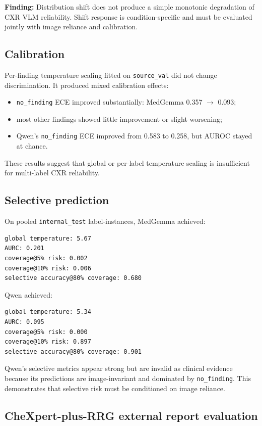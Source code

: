 \textbf{Finding:} Distribution shift does not produce a simple monotonic degradation of CXR VLM reliability. Shift response is condition-specific and must be evaluated jointly with image reliance and calibration.

\subsection{Calibration}

Per-finding temperature scaling fitted on \texttt{source\_val} did not change discrimination. It produced mixed calibration effects:

\begin{itemize}
\item \texttt{no\_finding} ECE improved substantially: MedGemma 0.357 $\rightarrow$ 0.093;
\item most other findings showed little improvement or slight worsening;
\item Qwen’s \texttt{no\_finding} ECE improved from 0.583 to 0.258, but AUROC stayed at chance.
\end{itemize}

These results suggest that global or per-label temperature scaling is insufficient for multi-label CXR reliability.

\subsection{Selective prediction}

On pooled \texttt{internal\_test} label-instances, MedGemma achieved:

\begin{verbatim}
global temperature: 5.67
AURC: 0.201
coverage@5% risk: 0.002
coverage@10% risk: 0.006
selective accuracy@80% coverage: 0.680
\end{verbatim}

Qwen achieved:

\begin{verbatim}
global temperature: 5.34
AURC: 0.095
coverage@5% risk: 0.000
coverage@10% risk: 0.897
selective accuracy@80% coverage: 0.901
\end{verbatim}

Qwen’s selective metrics appear strong but are invalid as clinical evidence because its predictions are image-invariant and dominated by \texttt{no\_finding}. This demonstrates that selective risk must be conditioned on image reliance.

\subsection{CheXpert-plus-RRG external report evaluation}

